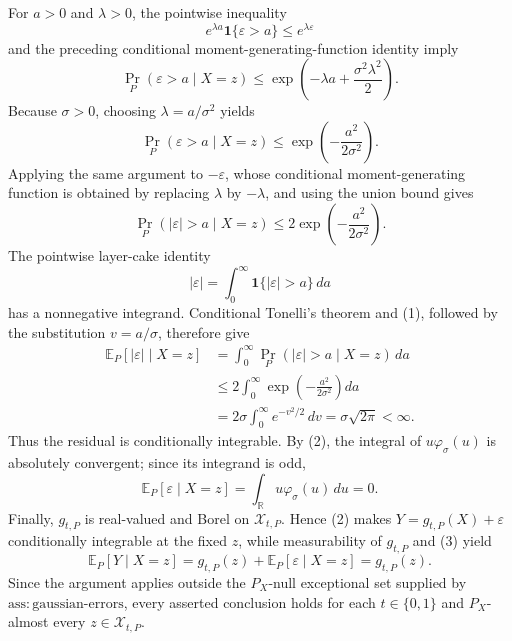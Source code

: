 For \(a>0\) and \(\lambda>0\), the pointwise inequality
\[
 e^{\lambda a}\mathbf 1\{\varepsilon>a\}\le e^{\lambda\varepsilon}
\]
and the preceding conditional moment-generating-function identity imply
\[
 \Pr_P(\varepsilon>a\mid X=z)
 \le \exp\!\left(-\lambda a+\frac{\sigma^2\lambda^2}{2}\right).
\]
Because \(\sigma>0\), choosing \(\lambda=a/\sigma^2\) yields
\[
 \Pr_P(\varepsilon>a\mid X=z)\le \exp\!\left(-\frac{a^2}{2\sigma^2}\right).
\]
Applying the same argument to \(-\varepsilon\), whose conditional moment-generating function is obtained by replacing \(\lambda\) by \(-\lambda\), and using the union bound gives
\[
 \Pr_P(|\varepsilon|>a\mid X=z)
 \le 2\exp\!\left(-\frac{a^2}{2\sigma^2}\right). \tag{1}
\]
The pointwise layer-cake identity
\[
 |\varepsilon|=\int_0^\infty \mathbf 1\{|\varepsilon|>a\}\,da
\]
has a nonnegative integrand. Conditional Tonelli's theorem and (1), followed by the substitution \(v=a/\sigma\), therefore give
\[
 \begin{aligned}
 \mathbb E_P[|\varepsilon|\mid X=z]
 &=\int_0^\infty \Pr_P(|\varepsilon|>a\mid X=z)\,da\\
 &\le 2\int_0^\infty \exp\!\left(-\frac{a^2}{2\sigma^2}\right)da\\
 &=2\sigma\int_0^\infty e^{-v^2/2}\,dv
 =\sigma\sqrt{2\pi}<\infty.
 \end{aligned} \tag{2}
\]
Thus the residual is conditionally integrable. By (2), the integral of \(u\varphi_\sigma(u)\) is absolutely convergent; since its integrand is odd,
\[
 \mathbb E_P[\varepsilon\mid X=z]
 =\int_{\mathbb R}u\varphi_\sigma(u)\,du=0. \tag{3}
\]
Finally, \(g_{t,P}\) is real-valued and Borel on \(\mathcal X_{t,P}\). Hence (2) makes \(Y=g_{t,P}(X)+\varepsilon\) conditionally integrable at the fixed \(z\), while measurability of \(g_{t,P}\) and (3) yield
\[
 \mathbb E_P[Y\mid X=z]
 =g_{t,P}(z)+\mathbb E_P[\varepsilon\mid X=z]
 =g_{t,P}(z).
\]
Since the argument applies outside the \(P_X\)-null exceptional set supplied by \(\mathrm{ass:gaussian\text{-}errors}\), every asserted conclusion holds for each \(t\in\{0,1\}\) and \(P_X\)-almost every \(z\in\mathcal X_{t,P}\).